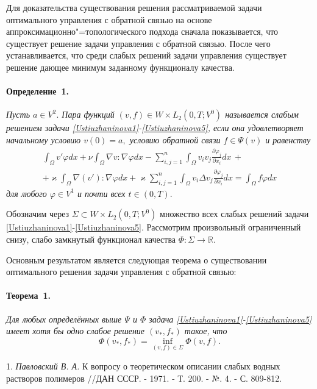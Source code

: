 Для доказательства существования решения рассматриваемой задачи оптимального управления с обратной связью на основе аппроксимационно"=топологического подхода сначала показывается, что существует решение задачи управления с обратной связью. После чего устанавливается, что среди слабых решений задачи управления существует решение дающее минимум заданному функционалу качества.

\paragraph{Определение~1.} {\it Пусть $a\in V^2.$ Пара функций $(v,f)\in W\times {L}_2(0,T;V^{0})$ называется слабым решением задачи \eqref{Ustiuzhaninova1}-\eqref{Ustiuzhaninova5}, если она
удовлетворяет начальному условию $v(0)= a,$ условию обратной связи $ f\in \Psi (v)$ и равенству
\begin{multline*}
\int_\Omega v'\varphi dx+\nu\int_\Omega \nabla v:\nabla\varphi dx -\sum_{i,j=1}^n \int_\Omega v_i v_j \frac{\partial\varphi_j}{\partial x_i}dx\,+\\+\varkappa\int_\Omega \nabla\left(v'\right):\nabla\varphi dx + \varkappa\sum_{i,j=1}^n\int_\Omega v_i \Delta v_j \frac{\partial\varphi_j}{\partial x_i}dx=\int_\Omega f\varphi dx
\end{multline*}
для любого $\varphi \in V^1$ и почти всех $t\in (0,T).$
}



Обозначим через $\Sigma \subset W\times L_2(0,T;V^0)$ множество всех слабых решений задачи \eqref{Ustiuzhaninova1}-\eqref{Ustiuzhaninova5}. Рассмотрим произвольный ограниченный снизу, слабо замкнутый функционал качества $\Phi: \Sigma \to \mathbb{R}.$

Основным результатом является следующая теорема о существовании оптимального решения задачи управления с обратной связью:
\paragraph{Теорема~1.} {\it
Для любых определённых выше $\Psi$ и $\Phi$ задача \eqref{Ustiuzhaninova1}-\eqref{Ustiuzhaninova5} имеет хотя бы одно слабое решение $(v_*,f_*)$ такое, что
$$
\Phi (v_*,f_*) = \inf\limits_{(v,f)\in \Sigma}\Phi (v,f).
$$
}

\litlist

1. {\it Павловский В. А.} К вопросу о теоретическом описании слабых водных растворов полимеров //ДАН СССР. - 1971. - Т. 200. - №. 4. - С. 809-812.

